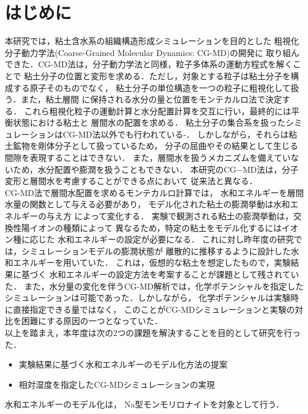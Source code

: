 \section{はじめに}
本研究では，粘土含水系の組織構造形成シミュレーションを目的とした
粗視化分子動力学法(Coarse-Grained Molecular Dynamics: CG-MD)の開発に
取り組んできた．CG-MD法は，分子動力学法と同様，粒子多体系の運動方程式を解くことで
粘土分子の位置と変形を求める．ただし，対象とする粒子は粘土分子を構成する原子そのものでなく，
粘土分子の単位構造を一つの粒子に粗視化して扱う．また，粘土層間
に保持される水分の量と位置をモンテカルロ法で決定する．
これら粗視化粒子の運動計算と水分配置計算を交互に行い，最終的には平衡状態における粘土と
層間水の配置を求める．
粘土分子の集合系を扱ったシミュレーションはCG-MD法以外でも行われている\cite{Eb2014}-\cite{Katti}．
しかしながら，それらは粘土鉱物を剛体分子として扱っているため，
分子の屈曲やその結果として生じる間隙を表現することはできない．
また，層間水を扱うメカニズムを備えていないため，水分配置や膨潤を扱うこともできない．
本研究のCG−MD法は，分子変形と層間水を考慮することができる点において
従来法と異なる．
\\
\hspace{\parindent}
CG-MD法で層間水配置を求めるモンテカルロ計算では，
水和エネルギーを層間水量の関数として与える必要があり，
モデル化された粘土の膨潤挙動は水和エネルギーの与え方
によって変化する．
実験で観測される粘土の膨潤挙動は，交換性陽イオンの種類によって
異なるため，特定の粘土をモデル化するにはイオン種に応じた
水和エネルギーの設定が必要になる．
これに対し昨年度の研究では，シミュレーションモデルの膨潤状態が
離散的に推移するように設計した水和エネルギーを用いていた．
これは，仮想的な粘土を想定したもので，実験結果に基づく
水和エネルギーの設定方法を考案することが課題として残されていた．
また，水分量の変化を伴うCG-MD解析では，化学ポテンシャルを指定した
シミュレーションは可能であった．しかしながら，
化学ポテンシャルは実験時に直接指定できる量ではなく，
このことがCG-MDシミュレーションと実験の対比を困難にする原因の一つとなっていた．\\
\hspace{\parindent}
以上を踏まえ，本年度は次の2つの課題を解決することを目的として研究を行った．
\begin{itemize}
\item
	実験結果に基づく水和エネルギーのモデル化方法の提案
\item
	相対湿度を指定したCG-MDシミュレーションの実現
\end{itemize}
水和エネルギーのモデル化は，
Na型モンモリロナイトを対象として行う．
